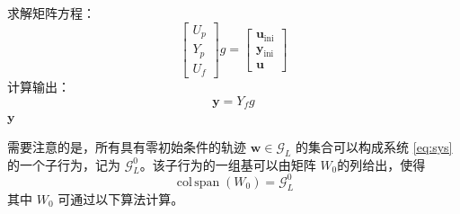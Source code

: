 \begin{algorithm}[H]
	\small
	\SetAlgoLined
	\caption{数据驱动仿真}
	\label{alg:data_driven_simulation}
	求解矩阵方程：
	\begin{equation}
		\begin{bmatrix} U_p \\ Y_p \\ U_f \end{bmatrix} g = \begin{bmatrix} \mathbf{u}_{\mathrm{ini}} \\ \mathbf{y}_{\mathrm{ini}} \\ \mathbf{u} \end{bmatrix}
		\label{eq:sim_g}
	\end{equation}
	计算输出：
	\begin{equation}
		\mathbf{y} = Y_f g
		\label{eq:sim_y}
	\end{equation}
	\Return $\mathbf{y}$
\end{algorithm}
需要注意的是，所有具有零初始条件的轨迹 \( \mathbf{w} \in \mathcal{G}_L \) 的集合可以构成系统 \eqref{eq:sys} 的一个子行为，记为 \( \mathcal{G}_L^0 \)。该子行为的一组基可以由矩阵 \( W_0 \)的列给出，使得
\begin{equation}
	\operatorname{col\,span}(W_0) = \mathcal{G}_L^0
	\label{eq:zero_initial_subspace}
\end{equation}
其中 \( W_0 \) 可通过以下算法计算。

